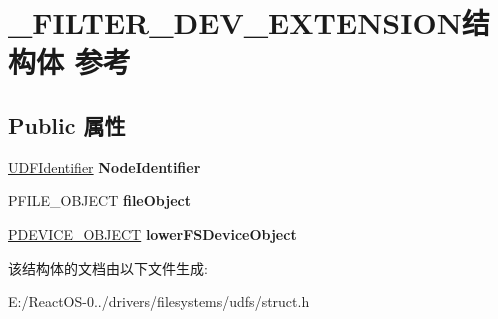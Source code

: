 \hypertarget{struct___f_i_l_t_e_r___d_e_v___e_x_t_e_n_s_i_o_n}{}\section{\+\_\+\+F\+I\+L\+T\+E\+R\+\_\+\+D\+E\+V\+\_\+\+E\+X\+T\+E\+N\+S\+I\+O\+N结构体 参考}
\label{struct___f_i_l_t_e_r___d_e_v___e_x_t_e_n_s_i_o_n}
\subsection*{Public 属性}
\begin{DoxyCompactItemize}
\item 
\mbox{\label{struct___f_i_l_t_e_r___d_e_v___e_x_t_e_n_s_i_o_n_ad9e570b063bea933918c67e4fddfeb7e}} 
\hyperlink{struct___u_d_f_identifier}{U\+D\+F\+Identifier} {\bfseries Node\+Identifier}
\item 
\mbox{\label{struct___f_i_l_t_e_r___d_e_v___e_x_t_e_n_s_i_o_n_a7b0ecfee402d451a4c2ecc00432133eb}} 
P\+F\+I\+L\+E\+\_\+\+O\+B\+J\+E\+CT {\bfseries file\+Object}
\item 
\mbox{\label{struct___f_i_l_t_e_r___d_e_v___e_x_t_e_n_s_i_o_n_a1ba3b0568a37d90320ed25f9d94127c4}} 
\hyperlink{struct___d_e_v_i_c_e___o_b_j_e_c_t}{P\+D\+E\+V\+I\+C\+E\+\_\+\+O\+B\+J\+E\+CT} {\bfseries lower\+F\+S\+Device\+Object}
\end{DoxyCompactItemize}


该结构体的文档由以下文件生成\+:\begin{DoxyCompactItemize}
\item 
E\+:/\+React\+O\+S-\/0../drivers/filesystems/udfs/struct.\+h\end{DoxyCompactItemize}
